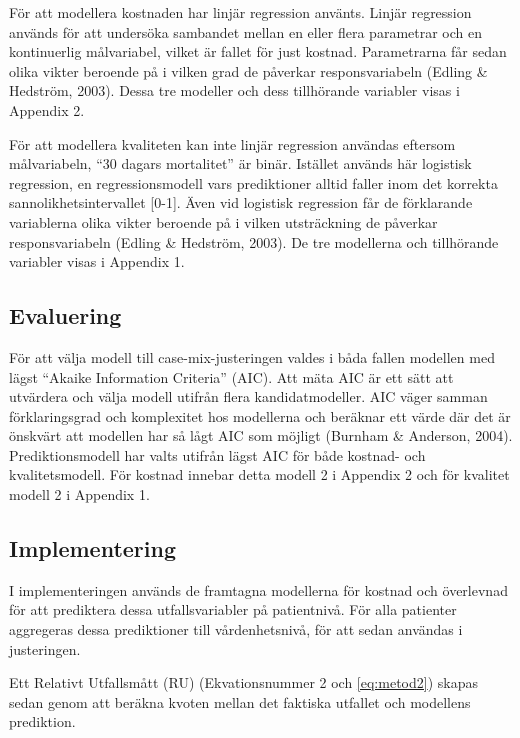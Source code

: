 För att modellera kostnaden har linjär regression använts. Linjär regression används för att undersöka sambandet mellan en eller flera parametrar och en kontinuerlig målvariabel, vilket är fallet för just kostnad. Parametrarna får sedan olika vikter beroende på i vilken grad de påverkar responsvariabeln (Edling \& Hedström, 2003). Dessa tre modeller och dess tillhörande variabler visas i Appendix 2.

För att modellera kvaliteten kan inte linjär regression användas eftersom målvariabeln, “30 dagars mortalitet” är binär. Istället används här logistisk regression, en regressionsmodell vars prediktioner alltid faller inom det korrekta sannolikhetsintervallet [0-1]. Även vid logistisk regression får de förklarande variablerna olika vikter beroende på i vilken utsträckning de påverkar responsvariabeln (Edling \& Hedström, 2003). De tre modellerna och tillhörande variabler visas i Appendix 1. 

\subsection{Evaluering}

För att välja modell till case-mix-justeringen valdes i båda fallen modellen med lägst “Akaike Information Criteria” (AIC). Att mäta AIC är ett sätt att utvärdera och välja modell utifrån flera kandidatmodeller. AIC väger samman förklaringsgrad och komplexitet hos modellerna och beräknar ett värde där det är önskvärt att modellen har så lågt AIC som möjligt (Burnham \& Anderson, 2004). Prediktionsmodell har valts utifrån lägst AIC för både kostnad- och kvalitetsmodell. För kostnad innebar detta modell 2 i Appendix 2 och för kvalitet modell 2 i Appendix 1.

\subsection{Implementering}

I implementeringen används de framtagna modellerna för kostnad och överlevnad för att prediktera dessa utfallsvariabler på patientnivå. För alla patienter aggregeras dessa prediktioner till vårdenhetsnivå, för att sedan användas i justeringen. 

Ett Relativt Utfallsmått (RU) (Ekvationsnummer 2 och \ref{eq:metod2}) skapas sedan genom att beräkna kvoten mellan det faktiska utfallet och modellens prediktion.


